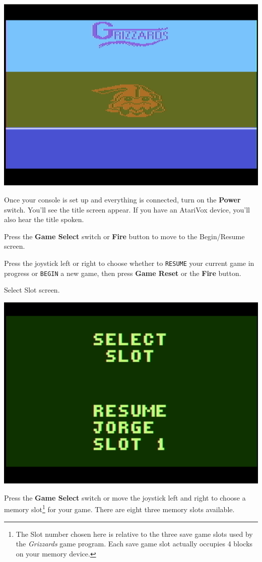 \documentclass[9pt,twocolumn,openany,article]{memoir}
\begin{document}
\begin{center}
  \includegraphics[width=.75\columnwidth]{../Manual/TitleAquaxNTSC.png}
\end{center}

Once your  console is set  up and everything  is connected, turn  on the
\textbf{Power} switch. You'll  see the title screen appear.  If you have
an AtariVox device, you'll also hear the title spoken.

Press the \textbf{Game Select} switch or \textbf{Fire} button to move to
the
\ifdefined\NOSAVE
Begin/Resume screen.

Press the  joystick left or  right to choose whether  to \texttt{RESUME}
your current game  in progress or \texttt{BEGIN} a new  game, then press
\textbf{Game Reset} or the \textbf{Fire} button.

\else
Select Slot screen.

\begin{center}
  \includegraphics[width=.75\columnwidth]{../Manual/SelectSlotNTSC.png}
\end{center}

Press  the \textbf{Game  Select} switch  or move  the joystick  left and
right to  choose a  memory slot\ifdefined\ATARIAGESAVE\else\footnote{The
  Slot number chosen here is relative  to the three save game slots used
  by the \textit{Grizzards}  game program. Each save  game slot actually
  occupies  4  blocks  on  your  memory  device.}\fi{}  for  your  game.
There  are \ifdefined\ATARIAGESAVE  eight \else  three \fi  memory slots
available.
\end{document}
